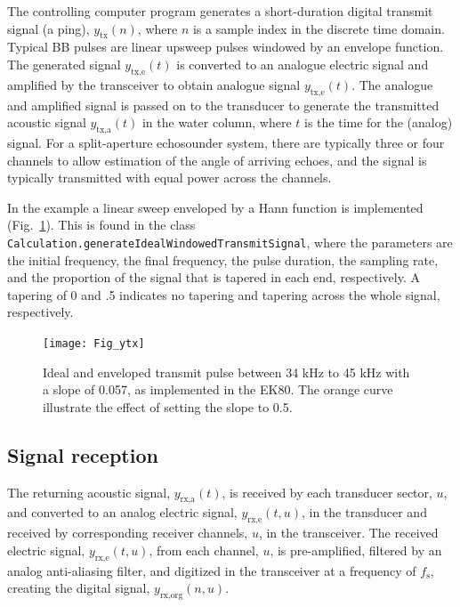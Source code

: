 \documentclass[preprint,12pt,TurnOnLineNumbers]{JASAnew}
\newcommand{\timesym}{t}
\newcommand{\samplesymt}{n}
\newcommand{\channelsym}{u}
\newcommand{\fs}{f_{\textrm{s}}}
\newcommand{\ytxe}{y_{\textrm{tx,e}}}
\newcommand{\ytxa}{y_{\textrm{tx,a}}}
\newcommand{\yrxa}{y_{\textrm{rx,a}}}
\newcommand{\yrxe}{y_{\textrm{rx,e}}}
\newcommand{\ytx}{y_{\textrm{tx}}}
\newcommand{\yrxorg}{y_{\textrm{rx,org}}}
\begin{document}
The controlling computer program generates a short-duration digital transmit signal (a ping), $\ytx(\samplesymt)$, where $\samplesymt$ is a sample index in the discrete time domain. Typical BB pulses are linear upsweep pulses windowed by an envelope function. The generated signal $\ytxe(\timesym)$ is converted to an analogue electric signal and amplified by the transceiver to obtain analogue signal $\ytxe(\timesym)$. The analogue and amplified signal is passed on to the transducer to generate the transmitted acoustic signal $\ytxa(\timesym)$ in the water column, where $\timesym$ is the time for the (analog) signal. For a split-aperture echosounder system, there are typically three or four channels to allow estimation of the angle of arriving echoes, and the signal is typically transmitted with equal power across the channels.

In the example a linear sweep enveloped by a Hann function is implemented (Fig.~\ref{fi:ytx}). This is found in the class \verb|Calculation.generateIdealWindowedTransmitSignal|, where the parameters are the initial frequency, the final frequency, the pulse duration, the sampling rate, and the proportion of the signal that is tapered in each end, respectively. A tapering of 0 and .5 indicates no tapering and tapering across the whole signal, respectively.
\begin{figure}
\texttt{[image: Fig\_ytx]}
\caption{\label{fi:ytx} Ideal and enveloped transmit pulse between 34 kHz to 45 kHz with a slope of 0.057, as implemented in the EK80. The orange curve illustrate the effect of setting the slope to 0.5.}
\end{figure}

\subsection{Signal reception}

The returning acoustic signal, $\yrxa(\timesym)$, is received by each transducer sector, $\channelsym$, and converted to an analog electric signal, $\yrxe(\timesym,\channelsym)$, in the transducer and received by corresponding receiver channels, $\channelsym$, in the transceiver. The received electric signal, $\yrxe(\timesym,\channelsym)$, from each channel, $\channelsym$, is pre-amplified, filtered by an analog anti-aliasing filter, and digitized in the transceiver at a frequency of $\fs$, creating the digital signal, $\yrxorg(\samplesymt,\channelsym)$.
\end{document}
